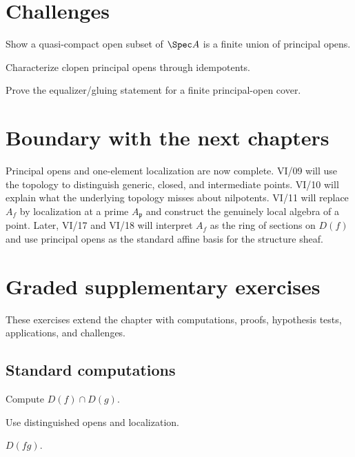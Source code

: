 \section{Challenges}
\ifdefined\FullProblemDossiers

\else
\begin{problem}Show a quasi-compact open subset of $\Spec A$ is a finite union of principal opens.\end{problem}
\begin{problem}Characterize clopen principal opens through idempotents.\end{problem}
\begin{problem}Prove the equalizer/gluing statement for a finite principal-open cover.\end{problem}
\fi

\section{Boundary with the next chapters}

Principal opens and one-element localization are now complete.  VI/09 will use the topology
to distinguish generic, closed, and intermediate points.  VI/10 will explain what the
underlying topology misses about nilpotents.  VI/11 will replace $A_f$ by localization at a
prime $A_{\mathfrak p}$ and construct the genuinely local algebra of a point.  Later, VI/17
and VI/18 will interpret $A_f$ as the ring of sections on $D(f)$ and use principal opens as
the standard affine basis for the structure sheaf.
\section{Graded supplementary exercises}
These exercises extend the chapter with computations, proofs, hypothesis tests, applications, and challenges.

\subsection*{Standard computations}

\begin{exercise}[Intersection]\label{exr:vi08-expand-01}
Compute $D(f)\cap D(g)$.
\end{exercise}
\begin{hint}
Use distinguished opens and localization.
\end{hint}
\begin{solution}
$D(fg)$.
\end{solution}

